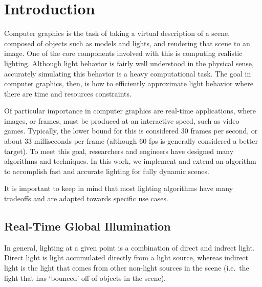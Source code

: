 \chapter{Introduction}
Computer graphics is the task of taking a virtual description of a scene, composed of objects such as models and lights, and rendering that scene to an image. One of the core components involved with this is computing realistic lighting. Although light behavior is fairly well understood in the physical sense, accurately simulating this behavior is a heavy computational task. The goal in computer graphics, then, is how to efficiently approximate light behavior where there are time and resources constraints.


Of particular importance in computer graphics are real-time applications, where images, or frames, must be produced at an interactive speed, such as video games. Typically, the lower bound for this is considered 30 frames per second, or about 33 milliseconds per frame (although 60 fps is generally considered a better target). To meet this goal, researchers and engineers have designed many algorithms and techniques.
In this work, we implement and extend an algorithm to accomplish fast and accurate lighting for fully dynamic scenes.

It is important to keep in mind that most lighting algorithms have many tradeoffs and are adapted towards specific use cases. 

\section{Real-Time Global Illumination}
In general, lighting at a given point is a combination of direct and indrect light. Direct light is light accumulated directly from a light source, whereas indirect light is the light that comes from other non-light sources in the scene (i.e.\ the light that has `bounced' off of objects in the scene).

